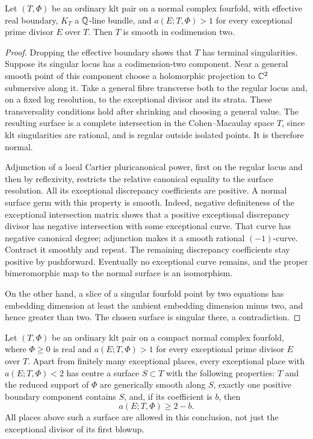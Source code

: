 \begin{lemma}\label{lem:terminal-codim-two}
Let $(T,\Phi)$ be an ordinary klt pair on a normal complex fourfold,
with effective real boundary, $K_T$ a $\mathbb Q$-line bundle, and
$a(E;T,\Phi)>1$ for every exceptional prime divisor $E$ over $T$.
Then $T$ is smooth in codimension two.
\end{lemma}

\begin{proof}
Dropping the effective boundary shows that $T$ has terminal
singularities.  Suppose its singular locus has a codimension-two
component.  Near a general smooth point of this component choose a
holomorphic projection to $\mathbb C^2$ submersive along it.  Take a general
fibre transverse both to the regular locus and, on a fixed log
resolution, to the exceptional divisor and its strata.  These
transversality conditions hold after shrinking and choosing a general
value.  The resulting surface is a complete intersection in the
Cohen--Macaulay space $T$, since klt singularities are rational, and is
regular outside isolated points.  It is therefore normal.

Adjunction of a local Cartier pluricanonical power, first on the regular
locus and then by reflexivity, restricts the relative canonical equality
to the surface resolution.  All its exceptional discrepancy coefficients
are positive.  A normal surface germ with this property is smooth.
Indeed, negative definiteness of the exceptional intersection matrix
shows that a positive exceptional discrepancy divisor has negative
intersection with some exceptional curve.  That curve has negative
canonical degree; adjunction makes it a smooth rational $(-1)$-curve.
Contract it smoothly and repeat.  The remaining discrepancy coefficients
stay positive by pushforward.  Eventually no exceptional curve remains,
and the proper bimeromorphic map to the normal surface is an isomorphism.

On the other hand, a slice of a singular fourfold point by two equations
has embedding dimension at least the ambient embedding dimension minus
two, and hence greater than two.  The chosen surface is singular there,
a contradiction.
\end{proof}

\begin{lemma}\label{lem:terminal-low-centres}
Let $(T,\Phi)$ be an ordinary klt pair on a compact normal complex
fourfold, where $\Phi\geq0$ is real and
$a(E;T,\Phi)>1$ for every exceptional prime divisor $E$ over $T$.
Apart from finitely many exceptional places, every exceptional place with
$a(E;T,\Phi)<2$ has centre a surface $S\subset T$ with the following
properties: $T$ and the reduced support of $\Phi$ are generically smooth
along $S$, exactly one positive boundary component contains $S$, and,
if its coefficient is $b$, then
\[
 a(E;T,\Phi)\geq 2-b.
\]
All places above such a surface are allowed in this conclusion, not just
the exceptional divisor of its first blowup.
\end{lemma}

